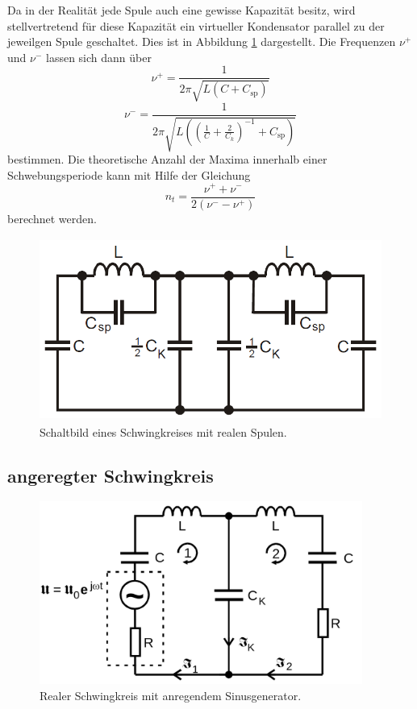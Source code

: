 Da in der Realität jede Spule auch eine gewisse Kapazität besitz, wird stellvertretend für diese Kapazität ein
virtueller Kondensator parallel zu der jeweilgen Spule geschaltet. Dies ist in Abbildung \ref{fig:bild7} dargestellt. 
Die Frequenzen $\nu^+$ und $\nu^-$ lassen sich dann über
\begin{equation}
    \nu^+=\frac{1}{2\pi\sqrt{L(C+C_{\text {sp}})}}
\end{equation}
\begin{equation}
    \nu^-=\frac{1}{2\pi\sqrt{L\left(\left(\frac{1}{C}+\frac{2}{C_k}\right)^{-1}+C_{\text {sp}}\right)}}
\end{equation}
bestimmen.
Die theoretische Anzahl der Maxima innerhalb einer Schwebungsperiode kann mit Hilfe der Gleichung
\begin{equation}
    n_t=\frac{\nu^++\nu^-}{2(\nu^--\nu^+)}
\end{equation}
berechnet werden.
\begin{figure}

    \centering
    \includegraphics[height=6.0cm]{data/Bild7.png}
    \caption{Schaltbild eines Schwingkreises mit realen Spulen.}
    \label{fig:bild7}
\end{figure}

\subsection{angeregter Schwingkreis}

\begin{figure}

    \centering
    \includegraphics[height=6.0cm]{data/Bild4.png}
    \caption{Realer Schwingkreis mit anregendem Sinusgenerator.}
    \label{fig:bild4}
\end{figure}

